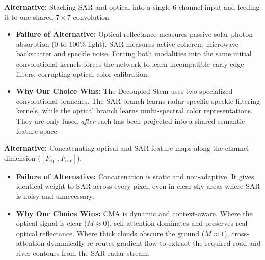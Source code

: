 \documentclass[11pt,a4paper]{article}
\begin{document}
\begin{tcolorbox}[colback=white,colframe=secondary,title=\textbf{2. Why a Decoupled Multimodal Stem over Simple Early Channel Stacking?}]
\textbf{Alternative:} Stacking SAR and optical into a single 6-channel input and feeding it to one shared $7\times 7$ convolution.
\begin{itemize}[leftmargin=1.2em, itemsep=0.2em]
    \item \textbf{Failure of Alternative:} Optical reflectance measures passive solar photon absorption ($0$ to $100\%$ light). SAR measures active coherent microwave backscatter and speckle noise. Forcing both modalities into the same initial convolutional kernels forces the network to learn incompatible early edge filters, corrupting optical color calibration.
    \item \textbf{Why Our Choice Wins:} The Decoupled Stem uses two specialized convolutional branches. The SAR branch learns radar-specific speckle-filtering kernels, while the optical branch learns multi-spectral color representations. They are only fused \textit{after} each has been projected into a shared semantic feature space.
\end{itemize}
\end{tcolorbox}

\begin{tcolorbox}[colback=white,colframe=primary,title=\textbf{3. Why Cross-Modality Attention (CMA) over Simple Feature Concatenation?}]
\textbf{Alternative:} Concatenating optical and SAR feature maps along the channel dimension ($[F_{\text{opt}}, F_{\text{sar}}]$).
\begin{itemize}[leftmargin=1.2em, itemsep=0.2em]
    \item \textbf{Failure of Alternative:} Concatenation is static and non-adaptive. It gives identical weight to SAR across every pixel, even in clear-sky areas where SAR is noisy and unnecessary.
    \item \textbf{Why Our Choice Wins:} CMA is dynamic and context-aware. Where the optical signal is clear ($M \approx 0$), self-attention dominates and preserves real optical reflectance. Where thick clouds obscure the ground ($M \approx 1$), cross-attention dynamically re-routes gradient flow to extract the required road and river contours from the SAR radar stream.
\end{itemize}
\end{tcolorbox}
\end{document}
